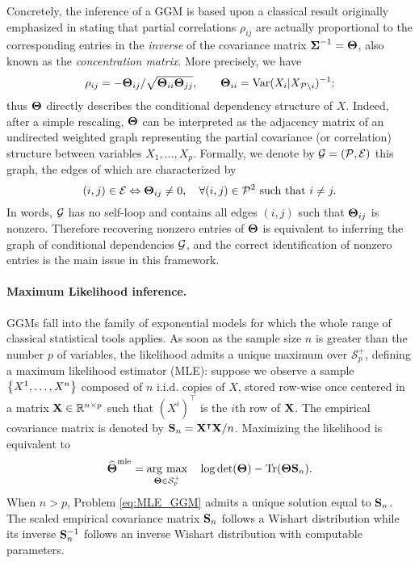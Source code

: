 Concretely, the  inference of a GGM  is based upon a  classical result
originally emphasized in  \cite{1972_Biometrics_Dempster} stating that
partial  correlations $\rho_{ij}$  are  actually  proportional to  the
corresponding entries  in the \emph{inverse} of  the covariance matrix
${\boldsymbol\Sigma}^{-1}  =   \boldsymbol\Theta$,  also  known  as   the  \emph{concentration
  matrix}. More precisely, we have
\begin{equation}
  \label{eq:parcor2invcov}
  \rho_{ij}      =  -\invcov_{ij}      /
  \sqrt{\invcov_{ii} \invcov_{jj}}, \qquad \invcov_{ii}=
  \var(X_i|X_{\mathcal{P}\backslash i})^{-1};
\end{equation}
thus $\boldsymbol\Theta$ directly describes the conditional dependency structure
of $X$. Indeed, after a simple rescaling, $\boldsymbol\Theta$ can be interpreted
as the adjacency  matrix of an undirected  weighted graph representing
the partial  covariance (or  correlation) structure  between variables
$X_{1},\ldots,X_{p}$. Formally,  we denote by $\mathcal{G}  = (\mathcal{P},
\mathcal{E})$ this graph, the edges of which are characterized by
\begin{displaymath}
  (i,j) \in \mathcal{E} \Leftrightarrow \boldsymbol\Theta_{ij} \neq 0, \quad \forall
  (i,j) \in \mathcal{P}^2 \text{ such that } i\neq j.
\end{displaymath}
In words,  $\mathcal{G}$ has  no self-loop and  contains all  edges $(i,j)$
such  that $\boldsymbol\Theta_{ij}$  is nonzero.   Therefore recovering  nonzero
entries  of  $\boldsymbol\Theta$  is  equivalent   to  inferring  the  graph  of
conditional dependencies  $\mathcal{G}$, and the correct  identification of
nonzero entries is the main issue in this framework.

\paragraph*{Maximum Likelihood inference.}  GGMs  fall into the family
of  exponential  models  for  which   the  whole  range  of  classical
statistical tools applies.  As soon as  the sample size $n$ is greater
than  the number  $p$ of  variables,  the likelihood  admits a  unique
maximum  over  $\mathcal{S}_{p}^+$,   defining  a  maximum  likelihood
estimator  (MLE): suppose  we observe  a sample  $\left\{X^1,\dots,X^n\right\}$
composed of $n$  i.i.d.  copies of $X$, stored  row-wise once centered
in a matrix $\mathbf{X} \in \mathbb{R}^{n\times  p}$ such that $(X^i)^\top$ is the
$i$th row  of $\mathbf{X}$.   The empirical covariance  matrix is  denoted by
$\mathbf{S}_n   =  \mathbf{X}^\intercal   \mathbf{X}/n$.   Maximizing   the
likelihood is equivalent to
\begin{equation}
\label{eq:MLE_GGM}
\widehat{\invcov}^{\text{mle}} = \argmax_{\invcov  \in \mathcal{S}_p^+}\quad
\log \det(\invcov) - \trace(\invcov \empcov).
\end{equation}
When $n>p$, Problem \eqref{eq:MLE_GGM}  admits a unique solution equal
to  $\mathbf{S}_n$.   The  scaled  empirical  covariance  matrix  $\mathbf{S}_n$
follows  a  Wishart  distribution  while  its  inverse  $\mathbf{S}_n^{-1}$
follows an inverse Wishart distribution with computable parameters.


